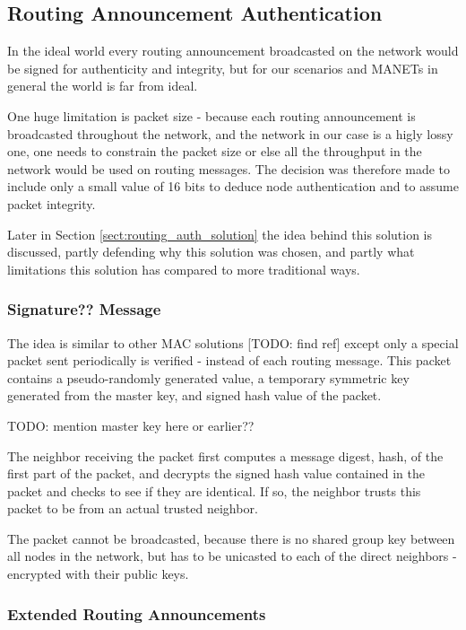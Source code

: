 \subsection{Routing Announcement Authentication}
In the ideal world every routing announcement broadcasted on the network would
be signed for authenticity and integrity, but for our scenarios and \acp{MANET}
in general the world is far from ideal.

One huge limitation is packet size - because each routing announcement is
broadcasted throughout the network, and the network in our case is a higly lossy
one, one needs to constrain the packet size or else all the throughput in the
network would be used on routing messages. The decision was therefore made to
include only a small value of 16 bits to deduce node authentication and to
assume packet integrity.

Later in Section \ref{sect:routing_auth_solution} the idea  behind this
solution is discussed, partly defending why this solution was chosen, and partly
what limitations this solution has compared to more traditional ways.

\subsubsection*{Signature?? Message}

The idea is similar to other \ac{MAC} solutions [TODO: find ref] except only a
special packet sent periodically is verified - instead of each routing message.
This packet contains a pseudo-randomly generated value, a temporary symmetric
key generated from the master key, and signed hash value of the packet.

TODO: mention master key here or earlier??

The neighbor receiving the packet first computes a message digest, hash, of the
first part of the packet, and decrypts the signed hash value contained in the
packet and checks to see if they are identical. If so, the neighbor trusts this
packet to be from an actual trusted neighbor.

The packet cannot be broadcasted, because there is no shared group key between
all nodes in the network, but has to be unicasted to each of the direct
neighbors - encrypted with their public keys.

\subsubsection*{Extended Routing Announcements}

